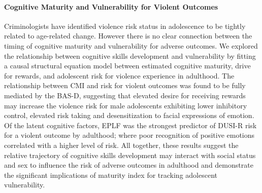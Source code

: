 \documentclass{article}%
\begin{document}
\paragraph*{Cognitive Maturity and Vulnerability for Violent Outcomes} Criminologists have identified violence risk status in adolescence to be tightly related to age-related change. However there is no clear connection between the timing of cognitive maturity and vulnerability for adverse outcomes. We explored the relationship between cognitive skills development and vulnerability by fitting a causal structural equation model between estimated cognitive maturity, drive for rewards, and adolescent risk for violence experience in adulthood. The relationship between CMI and risk for violent outcomes was found to be fully mediated by the BAS-D, suggesting that elevated desire for receiving rewards may increase the violence risk for male adolescents exhibiting lower inhibitory control, elevated risk taking and desensitization to facial expressions of emotion. Of the latent cognitive factors, EPLF was the strongest predictor of DUSI-R risk for a violent outcome by adulthood; where poor recognition of positive emotions correlated with a higher level of risk. All together, these results suggest the relative trajectory of cognitive skills development may interact with social status and sex to influence the risk of adverse outcomes in adulthood and demonstrate the significant implications of maturity index for tracking adolescent vulnerability. 
\vspace{2pt}
\end{document}

